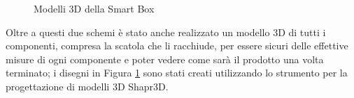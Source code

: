 \documentclass[a4paper, 12pt]{report}
\begin{document}
\begin{figure}[htbp]
  \centering
  \caption{Modelli 3D della Smart Box}
  \label{fig:models}
\end{figure}

Oltre a questi due schemi è stato anche realizzato un modello 3D di tutti i componenti, compresa la scatola che li racchiude, per essere sicuri delle effettive misure di ogni componente e poter vedere come sarà il 
prodotto una volta terminato; i disegni in Figura \ref{fig:models} sono stati creati utilizzando lo strumento per la progettazione di modelli 3D Shapr3D. 
\end{document}

